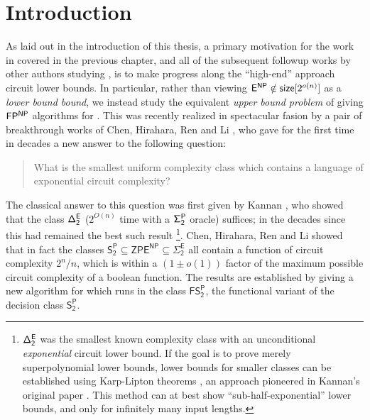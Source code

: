 %

\section{Introduction}
As laid out in the introduction of this thesis, a primary motivation for the work in \cite{Korten} covered in the previous chapter, and all of the subsequent followup works by other authors studying \avoid, is to make progress along the ``high-end'' approach circuit lower bounds. In particular, rather than viewing $\cl{E^{NP}} \notin \cl{size}[2^{o(n)}]$ as a \emph{lower bound bound}, we instead study the equivalent \emph{upper bound problem} of giving $\cl{FP^{NP}}$ algorithms for \avoid. This  was recently realized in spectacular fasion by a pair of breakthrough works of Chen, Hirahara, Ren \cite{CHR} and Li \cite{Li}, who gave for the first time in decades a new answer to the following question:
\begin{quotation}
What is the smallest uniform complexity class which contains a language of exponential circuit complexity?
\end{quotation}
The classical answer to this question was first given by Kannan \cite{Kannan}, who showed that the class $\cl{\Delta_2^E}$ ($2^{O(n)}$ time with a $\cl{\Sigma_2^P}$ oracle) suffices; in the decades since this had remained the best such result \footnote{$\cl{\Delta_2^E}$ was the smallest known complexity class with an unconditional \emph{exponential} circuit lower bound. If the goal is to prove merely superpolynomial lower bounds, lower bounds for smaller classes can be established using Karp-Lipton theorems \cite{karp-lipton}, an approach pioneered in Kannan's original paper \cite{Kannan}. This method can at best show ``sub-half-exponential'' lower bounds, and only for infinitely many input lengths.}. Chen, Hirahara, Ren and Li showed that in fact the classes $\mathsf{S_2^P}\subseteq \mathsf{ZPE^{NP}} \subseteq\mathsf{\Sigma_2^E} $ all contain a function of circuit complexity $2^n/n$, which is within a $(1 \pm o(1))$ factor of the maximum possible circuit complexity of a boolean function. The results are established by giving a new algorithm for \avoid which runs in the class $\mathsf{FS_2^P}$, the functional variant of the decision class $\mathsf{S_2^P}$. 

